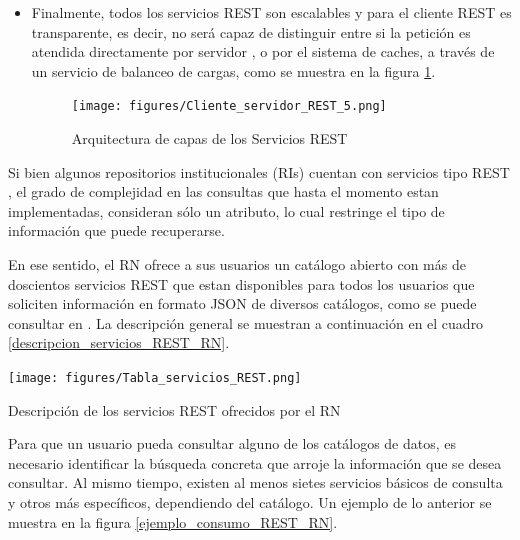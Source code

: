 \begin{itemize}
    \item Finalmente, todos los servicios REST son escalables y para el cliente REST es transparente, es decir, no será capaz de distinguir entre si la petición es atendida directamente por servidor , o por el sistema de caches, a través de un servicio de balanceo de cargas, como se muestra en la figura \ref{arquitectura_REST_5}.
    
    \begin{figure}[!ht]
    	\centering
    	\texttt{[image: figures/Cliente\_servidor\_REST\_5.png]} %
        \caption{Arquitectura de capas de los Servicios REST} %
        \label{arquitectura_REST_5}
    \end{figure}
    
\end{itemize}

Si bien algunos repositorios institucionales (RIs) cuentan con servicios tipo REST , el grado de complejidad en las consultas que hasta el momento estan implementadas, consideran sólo un atributo, lo cual restringe el tipo de información que puede recuperarse.\newline

En ese sentido, el RN ofrece a sus usuarios un catálogo abierto con más de doscientos servicios REST que estan disponibles para todos los usuarios que soliciten información en formato JSON de diversos catálogos, como se puede consultar en \cite{CatalogoREST_RN}. La descripción general se muestran a continuación en el cuadro \ref{descripcion_servicios_REST_RN}.

\begin{table}[!ht]
    \centering
    \texttt{[image: figures/Tabla\_servicios\_REST.png]} %
    \caption{Descripción de los servicios REST ofrecidos por el RN} %
    \label{descripcion_servicios_REST_RN}
\end{table}

Para que un usuario pueda consultar alguno de los catálogos de datos, es necesario identificar la búsqueda concreta que arroje la información que se desea consultar. Al mismo tiempo, existen al menos sietes servicios básicos de consulta y otros más específicos, dependiendo del catálogo. Un ejemplo de lo anterior se muestra en la figura \ref{ejemplo_consumo_REST_RN}.

